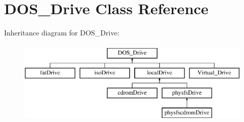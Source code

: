 \hypertarget{classDOS__Drive}{\section{D\-O\-S\-\_\-\-Drive Class Reference}
\label{classDOS__Drive}
}
Inheritance diagram for D\-O\-S\-\_\-\-Drive\-:\begin{figure}[H]
\begin{center}
\leavevmode
\includegraphics[height=4.000000cm]{classDOS__Drive}
\end{center}
\end{figure}
